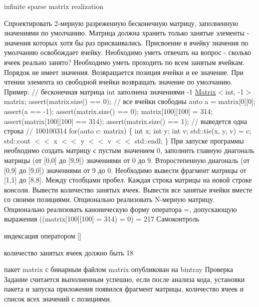 infinite sparse matrix realization

Спроектировать 2-\/мерную разреженную бесконечную матрицу, заполненную значениями по умолчанию. Матрица должна хранить только занятые элементы -\/ значения которых хотя бы раз присваивались. Присвоение в ячейку значения по умолчанию освобождает ячейку. Необходимо уметь отвечать на вопрос -\/ сколько ячеек реально занято? Необходимо уметь проходить по всем занятым ячейкам. Порядок не имеет значения. Возвращается позиция ячейки и ее значение. При чтении элемента из свободной ячейки возвращать значение по умолчанию. Пример\+: // бесконечная матрица int заполнена значениями -\/1 \hyperlink{classMatrix}{Matrix}$<$int, -\/1$>$ matrix; assert(matrix.\+size() == 0); // все ячейки свободны auto a = matrix\mbox{[}0\mbox{]}\mbox{[}0\mbox{]}; assert(a == -\/1); assert(matrix.\+size() == 0); matrix\mbox{[}100\mbox{]}\mbox{[}100\mbox{]} = 314; assert(matrix\mbox{[}100\mbox{]}\mbox{[}100\mbox{]} == 314); assert(matrix.\+size() == 1); // выведется одна строка // 100100314 for(auto c\+: matrix) \{ int x; int y; int v; std\+::tie(x, y, v) = c; std\+::cout $<$$<$ x $<$$<$ y $<$$<$ v $<$$<$ std\+::endl; \} При запуске программы необходимо создать матрицу с пустым значением 0, заполнить главную диагональ матрицы (от \mbox{[}0,0\mbox{]} до \mbox{[}9,9\mbox{]}) значениями от 0 до 9. Второстепенную диагональ (от \mbox{[}0,9\mbox{]} до \mbox{[}9,0\mbox{]}) значениями от 9 до 0. Необходимо вывести фрагмент матрицы от \mbox{[}1,1\mbox{]} до \mbox{[}8,8\mbox{]}. Между столбцами пробел. Каждая строка матрицы на новой строке консоли. Вывести количество занятых ячеек. Вывести все занятые ячейки вместе со своими позициями. Опционально реализовать N-\/мерную матрицу. Опционально реализовать каноническую форму оператора {\ttfamily =}, допускающую выражения {\ttfamily ((matrix\mbox{[}100\mbox{]}\mbox{[}100\mbox{]} = 314) = 0) = 217} Самоконтроль
\begin{DoxyItemize}
\item индексация оператором {\ttfamily \mbox{[}\mbox{]}}
\item количество занятых ячеек должно быть 18
\item пакет {\ttfamily matrix} с бинарным файлом {\ttfamily matrix} опубликован на bintray Проверка Задание считается выполненным успешно, если после анализа кода, установки пакета и запуска приложения появился фрагмент матрицы, количество ячеек и список всех значений с позициями. 
\end{DoxyItemize}